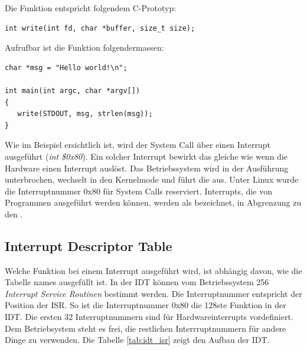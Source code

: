 Die Funktion entspricht folgendem C-Prototyp:
\begin{lstlisting}
int write(int fd, char *buffer, size_t size);
\end{lstlisting} \hfill

Aufrufbar ist die Funktion folgendermassen:
\begin{lstlisting}
char *msg = "Hello world!\n";

int main(int argc, char *argv[]) 
{
   write(STDOUT, msg, strlen(msg));
}
\end{lstlisting} \hfill

Wie im Beispiel ersichtlich ist, wird der System Call über einen Interrupt ausgeführt (\emph{int \$0x80}). Ein solcher Interrupt bewirkt
das gleiche wie wenn die Hardware einen Interrupt auslöst. Das Betriebssystem wird in der Ausführung unterbrochen, wechselt in den 
Kernelmode und führt die  aus. Unter Linux wurde die Interruptnummer 0x80 für System Calls reserviert.
Interrupts, die von Programmen ausgeführt werden können, werden als  bezeichnet, in Abgrenzung zu den . 

\subsection{Interrupt Descriptor Table}

Welche Funktion bei einem Interrupt ausgeführt wird, ist abhängig davon, wie die Tabelle names  ausgefüllt ist. In der IDT können vom Betriebssystem 256
\emph{Interrupt Service Routinen} bestimmt werden. Die Interruptnummer entspricht der Position der ISR. So ist die Interruptnummer 0x80 die 128ste Funktion in der IDT. Die ersten 32 Interruptnummern
sind für Hardwareinterrupts vordefiniert. Dem Betriebsystem steht es frei, die restlichen Interrruptnummern für andere Dinge zu verwenden. Die Tabelle \ref{tab:idt_isr} zeigt den Aufbau der IDT. 

